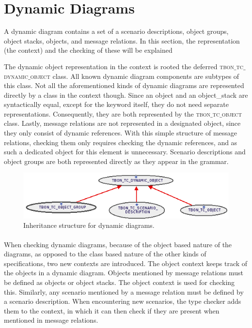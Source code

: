 \section{Dynamic Diagrams}
A dynamic diagram contains a set of a scenario descriptions, object groups, object stacks, objects, and message relations. In this section, the representation (the context) and the checking of these will be explained

The dynamic object representation in the context is rooted the deferred \textsc{tbon$\_$tc$\_$dynamic$\_$object} class. All known dynamic diagram components are subtypes of this class. Not all the aforementioned kinds of dynamic diagrams are represented directly by a class in the context though. Since an object and an object\_stack are syntactically equal, except for the keyword itself, they do not need separate representations. Consequently, they are both represented by the \textsc{tbon$\_$tc$\_$object} class. Lastly, message relations are not represented in a designated object, since they only consist of dynamic references. With this simple structure of message relations, checking them only requires checking the dynamic references, and as such a dedicated object for this element is unnecessary. Scenario descriptions and object groups are both represented directly as they appear in the grammar.

\begin{figure}[h]
\centerline{
\includegraphics[scale=0.7]{images/dynamic-diagram.png}
}
\caption{Inheritance structure for dynamic diagrams.}
\label{fig:dynamic-diagram}
\end{figure}

\paragraph{}
When checking dynamic diagrams, because of the object based nature of the diagrams, as opposed to the class based nature of the other kinds of specifications, two new contexts are introduced. The object context keeps track of the objects in a dynamic diagram. Objects mentioned by message relations must be defined as objects or object stacks. The object context is used for checking this. Similarly, any scenario mentioned by a message relation must be defined by a scenario description. When encountering new scenarios, the type checker adds them to the context, in which it can then check if they are present when mentioned in message relations.

